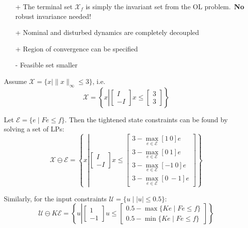 \begin{itemize}
    \item [+] The terminal set $\mathcal{X}_f$ is simply the invariant set from the OL problem.~\textbf{No} robust invariance needed!
    \item [+] Nominal and disturbed dynamics are completely decoupled
    \item [+] Region of convergence can be specified        %
    \item [-] Feasible set smaller  %
\end{itemize}

\begin{examplesection}
    Assume $\mathcal{X} = \{x \mid \|x\|_\infty \leq 3\}$, i.e.
    \begin{equation*}
        \mathcal{X} = \left\{ x \left|
        \begin{bmatrix}
            I \\ -I
        \end{bmatrix} x \leq
        \begin{bmatrix}
            3 \\ 3
        \end{bmatrix}
        \right. \right\}
    \end{equation*}

    Let $\mathcal{E} = \{e \mid F e \leq f\}$. Then the tightened state constraints can be found by solving a set of LPs:
    \begin{equation*}
        \mathcal{X} \ominus \mathcal{E} = \left\{ x \left|
        \begin{bmatrix}
            I \\ -I
        \end{bmatrix} x \leq
        \begin{bmatrix}
            3 - \max\limits_{e \in \mathcal{E}} [1 \ 0] e  \\
            3 - \max\limits_{e \in \mathcal{E}} [0 \ 1] e  \\
            3 - \max\limits_{e \in \mathcal{E}} [-1 \ 0] e \\
            3 - \max\limits_{e \in \mathcal{E}} [0 \ -1] e
        \end{bmatrix}
        \right. \right\}
    \end{equation*}

    Similarly, for the input constraints $\mathcal{U} = \{u \mid |u| \leq 0.5\}$:
    \begin{equation*}
        \mathcal{U} \ominus K \mathcal{E} = \left\{ u \left|
        \begin{bmatrix}
            1 \\ -1
        \end{bmatrix} u \leq
        \begin{bmatrix}
            0.5 - \max\{K e \mid F e \leq f\} \\
            0.5 - \min\{K e \mid F e \leq f\}
        \end{bmatrix}
        \right. \right\}
    \end{equation*}
\end{examplesection}

